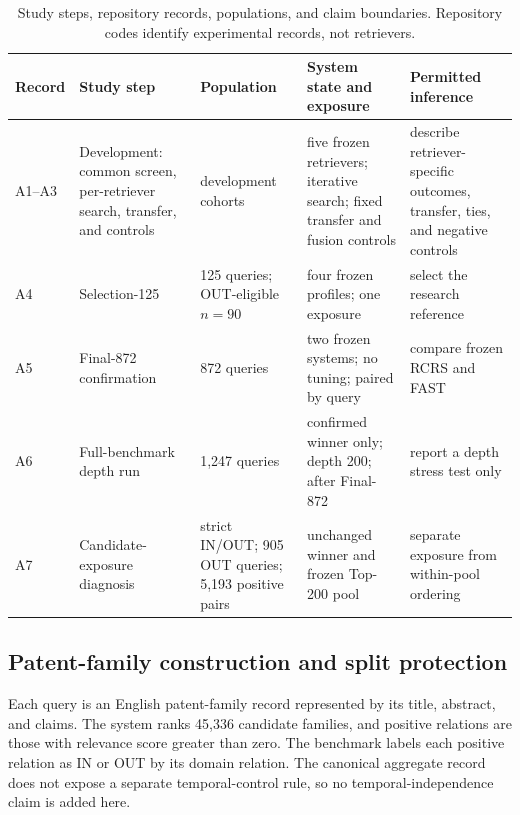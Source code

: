 \documentclass[final,5p,times,twocolumn]{elsarticle}
\newenvironment{widejournal}{\begin{table}[!t]}{\end{table}}
\newcommand{\journalTableFont}{\footnotesize}
\newenvironment{widejournal}{\begin{table}[!htbp]}{\end{table}}
\newcommand{\journalTableFont}{\footnotesize}
\begin{document}
\ifdefined\RCRSReader\clearpage\fi
\begin{widejournal}
\caption{Study steps, repository records, populations, and claim boundaries.
Repository codes identify experimental records, not retrievers.}
\label{tab:protocol}
\centering
\journalTableFont
\renewcommand{\arraystretch}{0.98}
\begin{tabularx}{\textwidth}{@{}P{1.2cm}P{2.3cm}P{2.6cm}P{3.4cm}Y@{}}
\toprule
Record & Study step & Population & System state and exposure & Permitted inference \\
\midrule
\mbox{A1--A3} & Development: common screen, per-retriever search, transfer, and controls
& development cohorts & five frozen retrievers; iterative search; fixed transfer and
fusion controls & describe retriever-specific outcomes, transfer, ties, and
negative controls \\
A4 & Selection-125 & 125 queries; OUT-eligible \(n=90\) & four frozen
profiles; one exposure & select the research reference \\
A5 & Final-872 confirmation & 872 queries & two frozen systems; no tuning;
paired by query & compare frozen RCRS and FAST \\
A6 & Full-benchmark depth run & 1,247 queries & confirmed winner only; depth
200; after Final-872 & report a depth stress test only \\
A7 & Candidate-exposure diagnosis & strict IN/OUT; 905 OUT queries; 5,193
positive pairs & unchanged winner and frozen Top-200 pool & separate exposure
from within-pool ordering \\
\bottomrule
\end{tabularx}
\end{widejournal}

\subsection{Patent-family construction and split protection}

Each query is an English patent-family record represented by its title,
abstract, and claims. The system ranks 45,336 candidate families, and positive
relations are those with relevance score greater than zero. The benchmark
labels each positive relation as IN or OUT by its domain relation. The
canonical aggregate record does not expose a separate temporal-control rule,
so no temporal-independence claim is added here.
\end{document}
